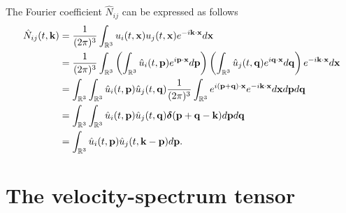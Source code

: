\documentclass[oneside,a4paper,11pt]{report}
\begin{document}
The Fourier coefficient $\hat{N}_{ij}$ can be expressed as follows
\begin{align}
\hat{N}_{ij}(t,\mathbf{k}) &= \frac{1}{(2\pi)^3} \int_{\mathbb{R}^3} u_i(t,\mathbf{x}) u_j(t,\mathbf{x}) e^{-i \mathbf{k} \cdot \mathbf{x}} d\mathbf{x} \nonumber \\
&= \frac{1}{(2\pi)^3} \int_{\mathbb{R}^3} \left ( \int_{\mathbb{R}^3} \hat{u}_i(t,\mathbf{p}) e^{i \mathbf{p} \cdot \mathbf{x}} d\mathbf{p} \right ) \left ( \int_{\mathbb{R}^3} \hat{u}_j(t,\mathbf{q}) e^{i\mathbf{q} \cdot \mathbf{x}} d \mathbf{q} \right ) e^{-i \mathbf{k} \cdot \mathbf{x}} d\mathbf{x} \nonumber \\
&= \int_{\mathbb{R}^3} \int_{\mathbb{R}^3} \hat{u}_i(t,\mathbf{p}) \hat{u}_j(t,\mathbf{q}) \frac{1}{(2\pi)^3} \int_{\mathbb{R}^3} e^{i (\mathbf{p} + \mathbf{q}) \cdot \mathbf{x}} e^{-i \mathbf{k} \cdot \mathbf{x}} d\mathbf{x} d\mathbf{p} d\mathbf{q} \nonumber \\
&=  \int_{\mathbb{R}^3} \int_{\mathbb{R}^3} \hat{u}_i(t,\mathbf{p}) \hat{u}_j(t,\mathbf{q}) \boldsymbol{\delta}(\mathbf{p} + \mathbf{q} - \mathbf{k})  d\mathbf{p} d\mathbf{q} \nonumber \\
&= \int_{\mathbb{R}^3} \hat{u}_i(t,\mathbf{p}) \hat{u}_j(t,\mathbf{k} - \mathbf{p}) d\mathbf{p}.
\end{align}

\section{The velocity-spectrum tensor}
\end{document}
